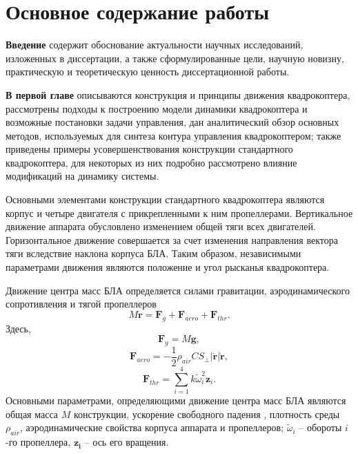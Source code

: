 \chapter{Основное содержание работы}
\textbf{Введение} содержит обоснование актуальности научных исследований, изложенных в диссертации,
а также сформулированные цели, научную новизну, практическую и теоретическую ценность диссертационной работы.

\textbf{В первой главе} описываются конструкция и принципы движения квадрокоптера,
рассмотрены подходы к построению модели динамики квадрокоптера и возможные постановки задачи управления,
дан аналитический обзор основных методов, используемых для синтеза контура управления квадрокоптером;
также приведены примеры усовершенствования конструкции стандартного квадрокоптера,
для некоторых из них подробно рассмотрено влияние модификаций на динамику системы.

Основными элементами конструкции стандартного квадрокоптера являются корпус и четыре двигателя с прикрепленными к ним пропеллерами. Вертикальное движение аппарата обусловлено изменением общей тяги всех двигателей. Горизонтальное движение совершается за счет изменения направления вектора тяги вследствие наклона корпуса БЛА. Таким образом, независимыми параметрами движения являются положение и угол рысканья квадрокоптера.

Движение центра масс БЛА определяется силами гравитации, аэродинамического сопротивления и тягой пропеллеров
\begin{equation} \label{eq:common_traslational_motion}
M \ddot{\bm{r}} = \bm{F}_g + \bm{F}_{aero} + \bm{F}_{thr}.
\end{equation}
Здесь, 
\begin{equation} \label{eq:gravity_force}
\bm{F}_g = M\bm{g},
\end{equation}
\begin{equation} \label{eq:aerodynamic_force}
\bm{F}_{aero} = - \frac{1}{2} \rho_{air} C S_{\perp} |\dot{\bm{r}}| \dot{\bm{r}},
\end{equation}
\begin{equation} \label{eq:thrust_force}
\bm{F}_{thr} = \sum_{i=1}^{4}{ { k \tilde\omega^2_i \bm{z}_i}.}
\end{equation}
Основными параметрами, определяющими движение центра масс БЛА являются общая масса {$M$} конструкции, ускорение свободного падения , плотность среды {$\rho_{air}$}, аэродинамические свойства корпуса аппарата и пропеллеров; $\tilde\omega_i$ -- обороты $i$-го пропеллера, $\bm{z_i}$ -- ось его вращения.

